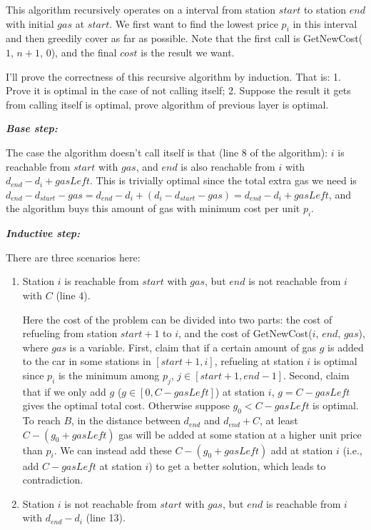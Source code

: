 \documentclass{oxmathproblems}
\begin{document}
\begin{questions}
\begin{Solution}
\begin{parts}
This algorithm recursively operates on a interval from station $start$ to station $end$ with initial $gas$ at $start$. We first want to find the lowest price $p_i$ in this interval and then greedily cover as far as possible. Note that the first call is GetNewCost($1$, $n+1$, $0$), and the final $cost$ is the result we want.

\vspace{0.5cm}

I'll prove the correctness of this recursive algorithm by induction. That is: 1. Prove it is optimal in the case of not calling itself; 2. Suppose the result it gets from calling itself is optimal, prove algorithm of previous layer is optimal. 

\textbf{\textit{Base step:}}

The case the algorithm doesn't call itself is that (line 8 of the algorithm): $i$ is reachable from $start$ with $gas$, and $end$ is also reachable from $i$ with $d_{end}-d_i+gasLeft$. This is trivially optimal since the total extra gas we need is $d_{end}-d_{start}-gas=d_{end}-d_i+(d_i-d_{start}-gas)=d_{end}-d_i+gasLeft$, and the algorithm buys this amount of gas with minimum cost per unit $p_i$. 

\textbf{\textit{Inductive step:}}

There are three scenarios here:

\begin{enumerate}
    \item Station $i$ is reachable from $start$ with $gas$, but $end$ is not reachable from $i$ with $C$ (line 4). 
    
    Here the cost of the problem can be divided into two parts: the cost of refueling from station $start+1$ to $i$, and the cost of GetNewCost($i$, $end$, $gas$), where $gas$ is a variable. First, claim that if a certain amount of gas $g$ is added to the car in some stations in $[start+1, i]$, refueling at station $i$ is optimal since $p_i$ is the minimum among $p_j$, $j\in[start+1, end-1]$. Second, claim that if we only add $g$ ($g\in[0, C-gasLeft]$) at station $i$, $g=C-gasLeft$ gives the optimal total cost. Otherwise suppose $g_0<C-gasLeft$ is optimal. To reach $B$, in the distance between $d_{end}$ and $d_{end}+C$, at least $C-(g_0+gasLeft)$ gas will be added at some station at a higher unit price than $p_i$. We can instead add these $C-(g_0+gasLeft)$ add at station $i$ (i.e., add $C-gasLeft$ at station $i$) to get a better solution, which leads to contradiction. 

    \item Station $i$ is not reachable from $start$ with $gas$, but $end$ is reachable from $i$ with $d_{end}-d_i$ (line 13).


\end{enumerate}
\end{parts}
\end{Solution}
\end{questions}
\end{document}
